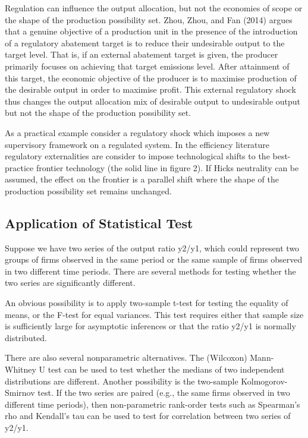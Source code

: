 \documentclass[
  10pt,
]{article}
\begin{document}
Regulation can influence the output allocation, but not the economies of
scope or the shape of the production possibility set. Zhou, Zhou, and
Fan (2014) argues that a genuine objective of a production unit in the
presence of the introduction of a regulatory abatement target is to
reduce their undesirable output to the target level. That is, if an
external abatement target is given, the producer primarily focuses on
achieving that target emissions level. After attainment of this target,
the economic objective of the producer is to maximise production of the
desirable output in order to maximise profit. This external regulatory
shock thus changes the output allocation mix of desirable output to
undesirable output but not the shape of the production possibility set.

As a practical example consider a regulatory shock which imposes a new
supervisory framework on a regulated system. In the efficiency
literature regulatory externalities are consider to impose technological
shifts to the best-practice frontier technology (the solid line in
figure 2). If Hicks neutrality can be assumed, the effect on the
frontier is a parallel shift where the shape of the production
possibility set remains unchanged.

\hypertarget{application-of-statistical-test}{%
\subsection{Application of Statistical
Test}\label{application-of-statistical-test}}

Suppose we have two series of the output ratio y2/y1, which could
represent two groups of firms observed in the same period or the same
sample of firms observed in two different time periods. There are
several methods for testing whether the two series are significantly
different.

An obvious possibility is to apply two-sample t-test for testing the
equality of means, or the F-test for equal variances. This test requires
either that sample size is sufficiently large for asymptotic inferences
or that the ratio y2/y1 is normally distributed.

There are also several nonparametric alternatives. The (Wilcoxon)
Mann-Whitney U test can be used to test whether the medians of two
independent distributions are different. Another possibility is the
two-sample Kolmogorov-Smirnov test. If the two series are paired (e.g.,
the same firms observed in two different time periods), then
non-parametric rank-order tests such as Spearman's rho and Kendall's tau
can be used to test for correlation between two series of y2/y1.
\end{document}
